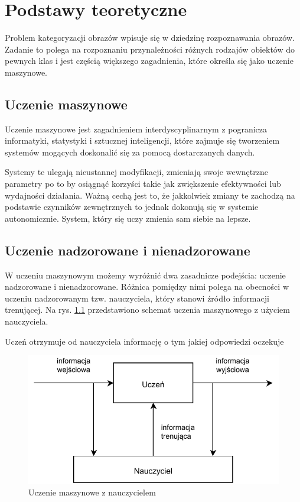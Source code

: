 \chapter{Podstawy teoretyczne}

Problem kategoryzacji obrazów wpisuje się w dziedzinę rozpoznawania obrazów. Zadanie to polega na rozpoznaniu przynależności różnych rodzajów obiektów do pewnych klas\cite{Tad91} i jest częścią większego zagadnienia, które określa się jako uczenie maszynowe.

\section{Uczenie maszynowe}

Uczenie maszynowe jest zagadnieniem interdyscyplinarnym z pogranicza informatyki, statystyki i sztucznej inteligencji, które zajmuje się tworzeniem systemów mogących doskonalić się za pomocą dostarczanych danych.

Systemy te ulegają nieustannej modyfikacji, zmieniają swoje wewnętrzne parametry po to by osiągnąć korzyści takie jak zwiększenie efektywności lub wydajności działania. Ważną cechą jest to, że jakkolwiek zmiany te zachodzą na podstawie czynników zewnętrznych to jednak dokonują się w systemie autonomicznie. System, który się uczy zmienia sam siebie na lepsze.\cite{CICHOSZ00}

\section{Uczenie nadzorowane i nienadzorowane}

W uczeniu maszynowym możemy wyróżnić dwa zasadnicze podejścia: uczenie nadzorowane i nienadzorowane. Różnica pomiędzy nimi polega na obecności w uczeniu nadzorowanym tzw. nauczyciela, który stanowi źródło informacji trenującej. Na rys. \ref{fig:supervised-learning} przedstawiono schemat uczenia maszynowego z użyciem nauczyciela.

Uczeń otrzymuje od nauczyciela informację o tym jakiej odpowiedzi oczekuje

\begin{figure}[h]
	\centering
	\includegraphics{graphics/01_podstawy_teoretyczne/supervised-learning.pdf}
	\caption{Uczenie maszynowe z nauczycielem \cite{CICHOSZ00}}
	\label{fig:supervised-learning}
\end{figure}

